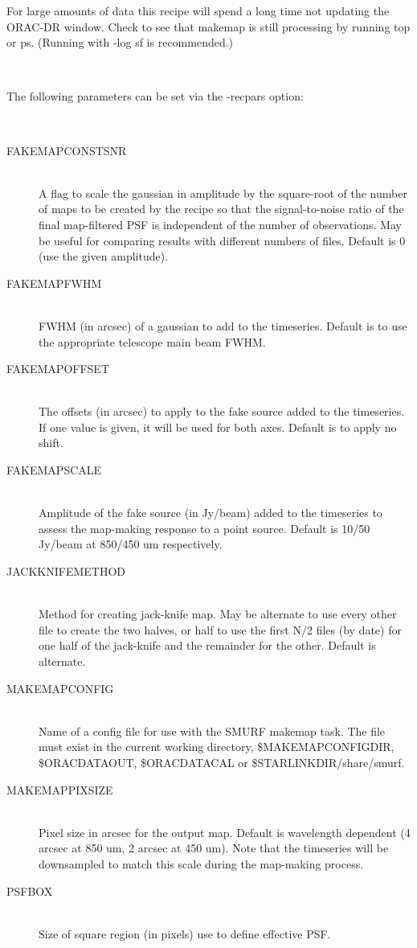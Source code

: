 \documentclass[twoside,11pt]{article}
\renewcommand{\_}{\texttt{\symbol{95}}}
\newcommand{\sstsubsection}[1]{ \item[{#1}] \mbox{} \\}
\newcommand{\sstdiylist}[2]{
   \item[#1:] \mbox{} \\
   \vspace{-3.5ex}
   \begin{description}
      #2
   \end{description}
}
\newcommand{\sstitem}{\item}
\newcommand{\sstsubsection}[1]{\item[{#1}]}
\newcommand{\sstitem}{\item}
\begin{document}
{{{         \sstitem
         For large amounts of data this recipe will spend a long time
         not updating the ORAC-DR window. Check to see that makemap is
         still processing by running top or ps. (Running with -log sf is
         recommended.)
      }
   }
   \sstdiylist{
      Available Parameters
   }{
      \sstsubsection{
         The following parameters can be set via the -recpars option:
      }{
      }
      \sstsubsection{
         FAKEMAP\_CONSTSNR
      }{
         A flag to scale the gaussian in amplitude by the square-root of
         the number of maps to be created by the recipe so that the
         signal-to-noise ratio of the final map-filtered PSF is
         independent of the number of observations. May be useful for
         comparing results with different numbers of files. Default is 0
         (use the given amplitude).
      }
      \sstsubsection{
         FAKEMAP\_FWHM
      }{
         FWHM (in arcsec) of a gaussian to add to the timeseries.
         Default is to use the appropriate telescope main beam FWHM.
      }
      \sstsubsection{
         FAKEMAP\_OFFSET
      }{
         The offsets (in arcsec) to apply to the fake source added to
         the timeseries. If one value is given, it will be used for both
         axes. Default is to apply no shift.
      }
      \sstsubsection{
         FAKEMAP\_SCALE
      }{
         Amplitude of the fake source (in Jy/beam) added to the
         timeseries to assess the map-making response to a point source.
         Default is 10/50 Jy/beam at 850/450 um respectively.
      }
      \sstsubsection{
         JACKKNIFE\_METHOD
      }{
         Method for creating jack-knife map. May be alternate to use
         every other file to create the two halves, or half to use the
         first N/2 files (by date) for one half of the jack-knife and
         the remainder for the other. Default is alternate.
      }
      \sstsubsection{
         MAKEMAP\_CONFIG
      }{
         Name of a config file for use with the SMURF makemap task. The
         file must exist in the current working directory,
         \$MAKEMAP\_CONFIG\_DIR, \$ORAC\_DATA\_OUT, \$ORAC\_DATA\_CAL or
         \$STARLINK\_DIR/share/smurf.
      }
      \sstsubsection{
         MAKEMAP\_PIXSIZE
      }{
         Pixel size in arcsec for the output map. Default is wavelength
         dependent (4 arcsec at 850 um, 2 arcsec at 450 um). Note that
         the timeseries will be downsampled to match this scale during
         the map-making process.
      }
      \sstsubsection{
         PSF\_BOX
      }{
         Size of square region (in pixels) use to define effective PSF.
}}}
\end{document}
